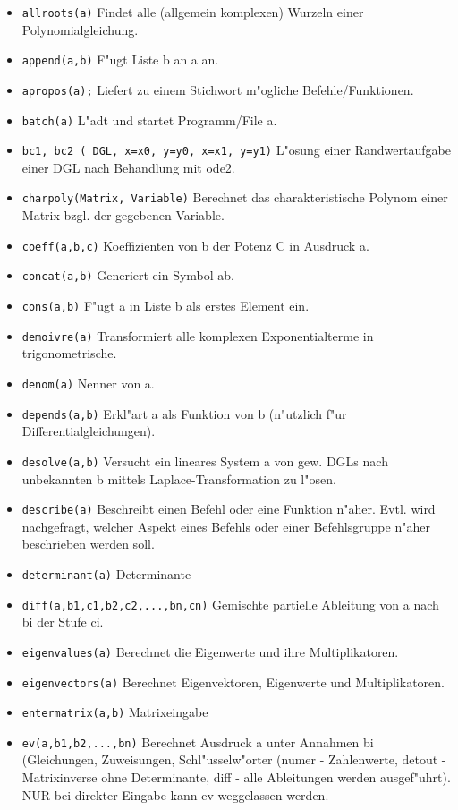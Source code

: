 \documentclass[spanish,12pt,a4paper]{article}
\begin{document}
\begin{itemize}
\item \verb|allroots(a)| Findet alle (allgemein komplexen) Wurzeln einer Polynomialgleichung.
\item \verb|append(a,b)| F"ugt Liste b an a an.
\item \verb|apropos(a);| Liefert zu einem Stichwort m"ogliche Befehle/Funktionen.
\item \verb|batch(a)| L"adt und startet Programm/File a.
\item \verb|bc1, bc2 ( DGL, x=x0, y=y0, x=x1, y=y1)| L"osung einer Randwertaufgabe einer DGL nach Behandlung mit ode2.
\item \verb|charpoly(Matrix, Variable)| Berechnet das charakteristische Polynom einer Matrix bzgl. der gegebenen Variable.
\item \verb|coeff(a,b,c)| Koeffizienten von b der Potenz C in Ausdruck a.
\item \verb|concat(a,b)| Generiert ein Symbol ab.
\item \verb|cons(a,b)| F"ugt a in Liste b als erstes Element ein.
\item \verb|demoivre(a)| Transformiert alle komplexen Exponentialterme in trigonometrische.
\item \verb|denom(a)| Nenner von a.
\item \verb|depends(a,b)| Erkl"art a als Funktion von b (n"utzlich f"ur Differentialgleichungen).
\item \verb|desolve(a,b)| Versucht ein lineares System a von gew. DGLs nach unbekannten b mittels Laplace-Transformation zu l"osen.
\item \verb|describe(a)| Beschreibt einen Befehl oder eine Funktion n"aher. Evtl. wird nachgefragt, welcher Aspekt eines Befehls oder einer Befehlsgruppe n"aher beschrieben werden soll.
\item \verb|determinant(a)| Determinante
\item \verb|diff(a,b1,c1,b2,c2,...,bn,cn)| Gemischte partielle Ableitung von a nach bi der Stufe ci.
\item \verb|eigenvalues(a)| Berechnet die Eigenwerte und ihre Multiplikatoren.
\item \verb|eigenvectors(a)| Berechnet Eigenvektoren, Eigenwerte und Multiplikatoren.
\item \verb|entermatrix(a,b)| Matrixeingabe
\item \verb|ev(a,b1,b2,...,bn)| Berechnet Ausdruck a unter Annahmen bi (Gleichungen, Zuweisungen, Schl"usselw"orter (numer - Zahlenwerte, detout - Matrixinverse ohne Determinante, diff - alle Ableitungen werden ausgef"uhrt). NUR bei direkter Eingabe kann ev weggelassen werden.

\end{itemize}
\end{document}
